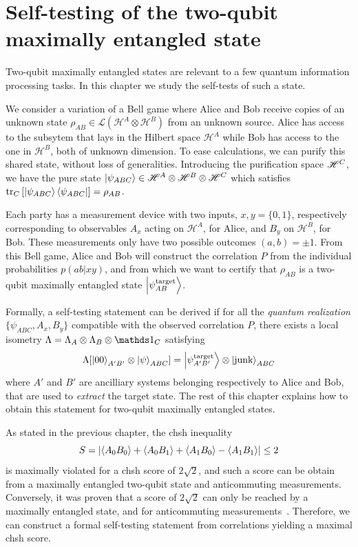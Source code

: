 \chapter{Self-testing of the two-qubit maximally entangled state}

Two-qubit maximally entangled states are relevant to a few quantum information processing tasks.
In this chapter we study the self-tests of such a state.

\medbreak 

We consider a variation of a Bell game where Alice and Bob receive copies of an unknown state $\rho_{AB} \in \mathcal{L}(\mathscr{H}^A \otimes \mathscr{H}^B)$ from an unknown source.
Alice has access to the subsytem that lays in the Hilbert space $\mathscr{H}^A$ while Bob has access to the one in $\mathscr{H}^B$, both of unknown dimension.
To ease calculations, we can purify this shared state, without loss of generalities. 
Introducing the purification space $\mathscr{H}^C$, we have the pure state $\ket{\psi_{ABC}}\in \mathscr{H}^A \otimes \mathscr{H}^B \otimes \mathscr{H}^C$ which satisfies $\tr_C \left[\ket{\psi_{ABC}}\bra{\psi_{ABC}}\right] = \rho_{AB}$.

Each party has a measurement device with two inputs, $x,y=\{0,1\}$, respectively corresponding to observables $A_x$ acting on $\mathscr{H}^A$, for Alice, and $B_y$ on $\mathscr{H}^B$, for Bob.
These measurements only have two possible outcomes $(a,b)=\pm1$.
From this Bell game, Alice and Bob will construct the correlation $P$ from the individual probabilities $p(ab|xy)$, and from which we want to certify that $\rho_{AB}$ is a two-qubit maximally entangled state $\ket{\psi^{\text{target}}_{AB}}$.

Formally, a self-testing statement can be derived if for all the \textit{quantum realization} $\{\psi_{ABC},A_x,B_y\}$ compatible with the observed correlation $P$, there exists a local isometry $\Lambda = \Lambda_A \otimes \Lambda_B \otimes \id_C$ satisfying
\begin{equation}
	\Lambda [ \ket{00}_{A'B'} \otimes \ket{\psi}_{ABC}] = \ket{\psi^\text{target}_{A'B'}} \otimes \ket{\text{junk}}_{ABC}
	\label{eq:self-testing_statement}
\end{equation}
where $A'$ and $B'$ are ancilliary systems belonging respectively to Alice and Bob, that are used to \textit{extract} the target state.
The rest of this chapter explains how to obtain this statement for two-qubit maximally entangled states.

\medbreak

As stated in the previous chapter, the \acrshort{chsh} inequality 
\begin{equation}
	S = \left | \langle {A_0 B_0} \rangle + \langle {A_0 B_1} \rangle + \langle {A_1 B_0} \rangle - \langle {A_1 B_1} \rangle  \right | \leq 2
\end{equation}
is maximally violated for a \acrshort{chsh} score of $2\sqrt{2}$, and such a score can be obtain from a maximally entangled two-qubit state and anticommuting measurements. 
Conversely, it was proven that a score of $2\sqrt{2}$ can only be reached by a maximally entangled state, and for anticommuting measurements~\cite{Summers1987,Popescu92,Tsirelson1993}. 
Therefore, we can construct a formal self-testing statement from correlations yielding a maximal \acrshort{chsh} score.

